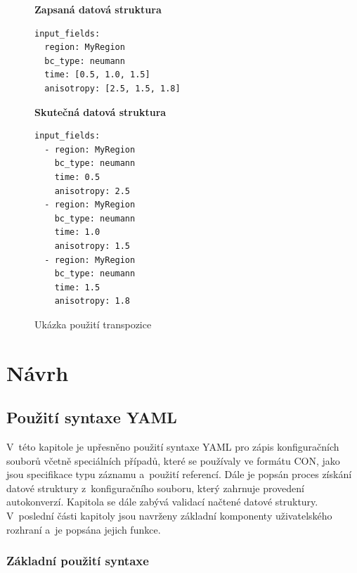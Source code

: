 \documentclass[FM,bw,DP]{tulthesis}
\begin{document}
\begin{figure}[ht]
\singlespacing
\begin{minipage}[t]{0.5\linewidth}
\vspace{0pt}
\textbf{Zapsaná datová struktura}\\
\vspace{-5pt}
\begin{lstlisting}
input_fields: 
  region: MyRegion
  bc_type: neumann
  time: [0.5, 1.0, 1.5]
  anisotropy: [2.5, 1.5, 1.8]
\end{lstlisting}
\end{minipage}
\hfill
\begin{minipage}[t]{0.45\linewidth}
\vspace{0pt}
\textbf{Skutečná datová struktura}\\
\vspace{-5pt}
\begin{lstlisting}
input_fields: 
  - region: MyRegion
    bc_type: neumann
    time: 0.5
    anisotropy: 2.5
  - region: MyRegion
    bc_type: neumann
    time: 1.0
    anisotropy: 1.5
  - region: MyRegion
    bc_type: neumann
    time: 1.5
    anisotropy: 1.8
\end{lstlisting}
\vspace*{-20pt}
\end{minipage}
\onehalfspacing
\caption{Ukázka použití transpozice}
\label{img:transposition_code_example}
\end{figure}

\chapter{Návrh}

\section{Použití syntaxe YAML}
V~této kapitole je upřesněno použití syntaxe \gls{YAML} pro zápis konfiguračních souborů včetně speciálních případů, které se používaly ve formátu \gls{CON}, jako jsou specifikace typu záznamu a~použití referencí. Dále je popsán proces získání datové struktury z~konfiguračního souboru, který zahrnuje provedení autokonverzí. Kapitola se dále zabývá validací načtené datové struktury. V~poslední části kapitoly jsou navrženy základní komponenty uživatelského rozhraní a~je popsána jejich funkce.

\subsection{Základní použití syntaxe}
\end{document}
